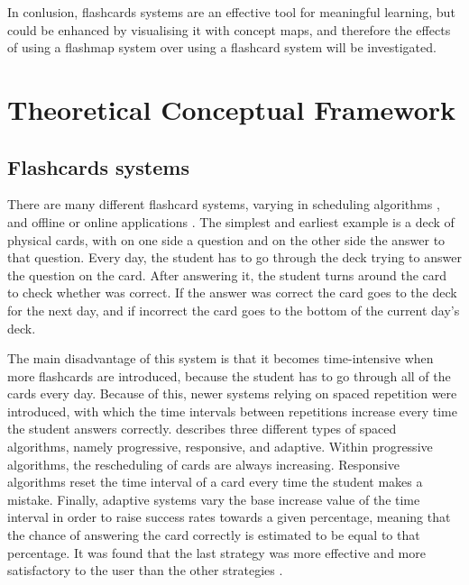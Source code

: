 
In conlusion, flashcards systems are an effective tool for meaningful learning, but could be enhanced by visualising it with concept maps, and therefore the effects of using a flashmap system over using a flashcard system will be investigated. 

\section{Theoretical Conceptual Framework}


\subsection{Flashcards systems}

There are many different flashcard systems, varying in scheduling algorithms \cite{microlearning}, and offline or online applications \cite{nakata}. The simplest and earliest example is a deck of physical cards, with on one side a question and on the other side the answer to that question. Every day, the student has to go through the deck trying to answer the question on the card. After answering it, the student turns around the card to check whether was correct. If the answer was correct the card goes to the deck for the next day, and if incorrect the card goes to the bottom of the current day's deck.

The main disadvantage of this system is that it becomes time-intensive when more flashcards are introduced, because the student has to go through all of the cards every day. Because of this, newer systems relying on spaced repetition were introduced, with which the time intervals between repetitions increase every time the student answers correctly.  describes three different types of spaced algorithms, namely progressive, responsive, and adaptive. Within progressive algorithms, the rescheduling of cards are always increasing. Responsive algorithms reset the time interval of a card every time the student makes a mistake. Finally, adaptive systems vary the base increase value of the time interval in order to raise success rates towards a given percentage, meaning that the chance of answering the card correctly is estimated to be equal to that percentage. It was found that the last strategy was more effective and more satisfactory to the user than the other strategies \cite{microlearning}.

